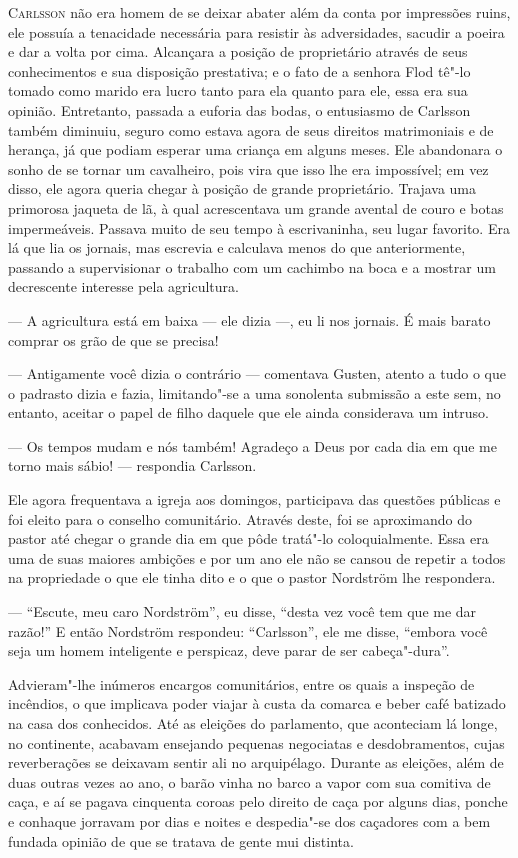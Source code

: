 \textsc{Carlsson} não era homem de se deixar abater além da conta por
impressões ruins, ele possuía a tenacidade necessária para resistir às adversidades,
sacudir a poeira e dar a volta por cima. Alcançara a posição de
proprietário através de seus conhecimentos e sua disposição prestativa; e o fato
de a senhora Flod tê"-lo tomado como marido era lucro tanto para ela quanto para
ele, essa era sua opinião. Entretanto, passada a euforia das bodas,
o entusiasmo de Carlsson também diminuiu, seguro como estava agora de
seus direitos matrimoniais e de herança, já que podiam esperar uma criança em
alguns meses. Ele abandonara o sonho de se tornar um cavalheiro, pois vira que
isso lhe era impossível; em vez disso, ele agora queria chegar à posição de
grande proprietário. Trajava uma primorosa jaqueta de lã, à qual acrescentava um
grande avental de couro e botas impermeáveis. Passava muito de seu tempo à
escrivaninha, seu lugar favorito. Era lá que lia os jornais, mas escrevia e
calculava menos do que anteriormente, passando a supervisionar o trabalho com um
cachimbo na boca e a mostrar um decrescente interesse pela agricultura.

--- A agricultura está em baixa --- ele dizia ---, eu li nos jornais. É mais barato
comprar os grão de que se precisa!

--- Antigamente você dizia o contrário --- comentava Gusten, 
atento a tudo o que o padrasto dizia e fazia, limitando"-se a uma sonolenta
submissão a este sem, no entanto, aceitar o papel de filho daquele que ele ainda 
considerava um intruso.

--- Os tempos mudam e nós também! Agradeço a Deus por cada dia em que me
torno mais sábio! --- respondia Carlsson. 

Ele agora frequentava a igreja aos domingos, participava 
das questões públicas e foi eleito para o
conselho comunitário. Através deste, foi se aproximando do pastor até chegar o
grande dia em que pôde tratá"-lo coloquialmente. 
Essa era uma de suas maiores ambições e por
um ano ele não se cansou de repetir a todos na propriedade o que ele tinha dito
e o que o pastor Nordström lhe respondera.

--- ``Escute, meu caro Nordström'', eu disse, ``desta vez você tem que me dar
razão!'' E então Nordström respondeu: ``Carlsson'', ele me disse, ``embora você seja 
um homem inteligente e perspicaz, deve parar de ser cabeça"-dura''.

Advieram"-lhe inúmeros encargos comunitários, entre os quais a inspeção de
incêndios, o que implicava poder viajar à custa da comarca e beber
café batizado na casa dos conhecidos. Até as eleições do parlamento, que
aconteciam lá longe, no continente, acabavam ensejando pequenas negociatas e desdobramentos, 
cujas reverberações se deixavam sentir ali no arquipélago. Durante as eleições, além de duas
outras vezes ao ano, o barão vinha no barco a vapor com sua comitiva de caça, e
aí se pagava cinquenta coroas pelo direito de caça por alguns dias, ponche e
conhaque jorravam por dias e noites e despedia"-se dos caçadores com a bem
fundada opinião de que se tratava de gente mui distinta.

